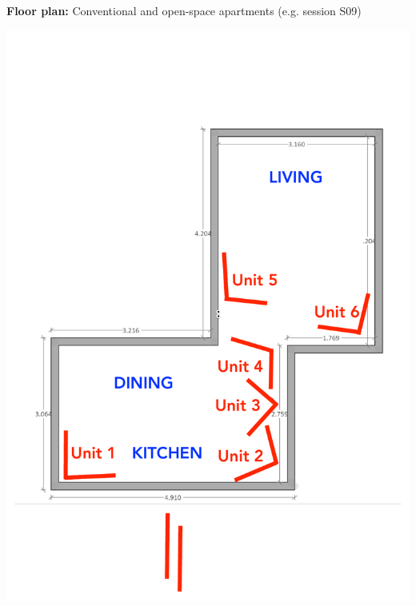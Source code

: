 \documentclass{beamer}
\begin{document}
\begin{frame}
{\begin{minipage}[t]{0.5\textwidth}
\begin{itemize}
    \begin{minipage}[b]{0.5\textwidth}    
      \item \textbf{Floor plan:} Conventional and open-space apartments (e.g. session S09) 
    \end{minipage}%
    \begin{minipage}[c]{0.4\textwidth}
      \centering
      \includegraphics[width=\textwidth]{img/floorplan_S09}
    \end{minipage}
  
  \end{itemize}

  \end{minipage}
 \hspace{-.25em}
  }
  \hfill
  \pause
\end{frame}
\end{document}
